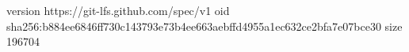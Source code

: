 version https://git-lfs.github.com/spec/v1
oid sha256:b884ee6846ff730c143793e73b4ee663aebffd4955a1ec632ce2bfa7e07bce30
size 196704
